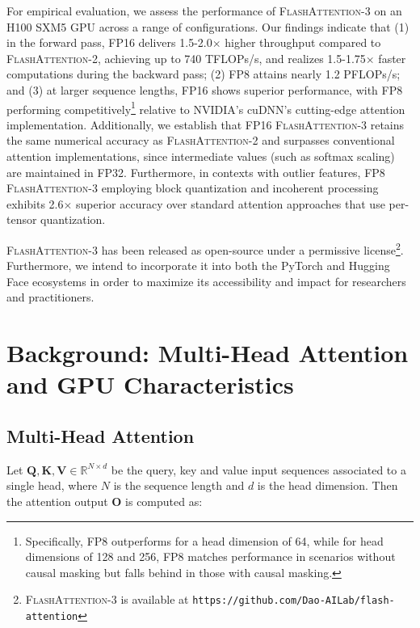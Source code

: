 For empirical evaluation, we assess the performance of \textsc{FlashAttention-3} on an H100 SXM5 GPU across a range of configurations. Our findings indicate that (1) in the forward pass, FP16 delivers 1.5-2.0$\times$ higher throughput compared to \textsc{FlashAttention-2}, achieving up to 740 TFLOPs/s, and realizes 1.5-1.75$\times$ faster computations during the backward pass; (2) FP8 attains nearly 1.2 PFLOPs/s; and (3) at larger sequence lengths, FP16 shows superior performance, with FP8 performing competitively\footnote{Specifically, FP8 outperforms for a head dimension of 64, while for head dimensions of 128 and 256, FP8 matches performance in scenarios without causal masking but falls behind in those with causal masking.} relative to NVIDIA’s cuDNN’s cutting-edge attention implementation. Additionally, we establish that FP16 \textsc{FlashAttention-3} retains the same numerical accuracy as \textsc{FlashAttention-2} and surpasses conventional attention implementations, since intermediate values (such as softmax scaling) are maintained in FP32. Furthermore, in contexts with outlier features, FP8 \textsc{FlashAttention-3} employing block quantization and incoherent processing exhibits 2.6$\times$ superior accuracy over standard attention approaches that use per-tensor quantization.

\textsc{FlashAttention-3} has been released as open-source under a permissive license\footnote{\textsc{FlashAttention-3}
  is available at \texttt{https://github.com/Dao-AILab/flash-attention}}. Furthermore, we intend to incorporate it into both the PyTorch and Hugging Face ecosystems in order to maximize its accessibility and impact for researchers and practitioners.

\section{Background: Multi-Head Attention and GPU Characteristics}
\label{sec:background}

\subsection{Multi-Head Attention}
\label{subsec:multi_head_attn}

Let $\mathbf{Q}, \mathbf{K}, \mathbf{V} \in \mathbb{R}^{N \times d}$ be the query, key and value input sequences associated to a single head, where $N$ is the sequence length and $d$ is the head dimension. Then the attention output $\mathbf{O}$ is computed as:

